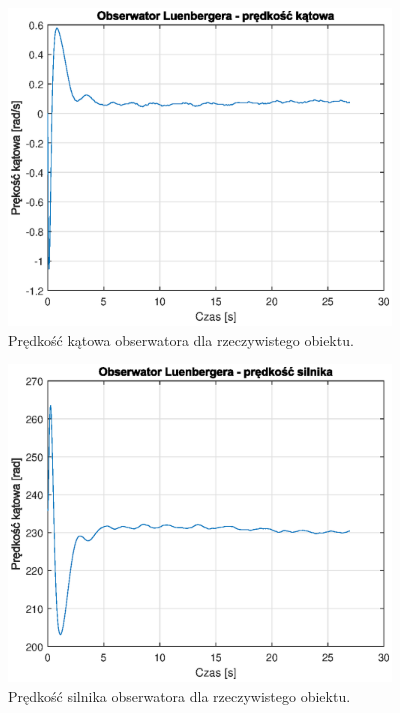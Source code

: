 \documentclass[11pt,a4paper]{article}
\begin{document}
\begin{figure}[H]
	\centering
	\includegraphics[width=4in]{Figures/obsv_obj_dalpha_v.eps}
	\caption{Prędkość kątowa obserwatora dla rzeczywistego obiektu.}
	\label{fig:obsv_obj_dalpha_v}
\end{figure}

\begin{figure}[H]
	\centering
	\includegraphics[width=4in]{Figures/obsv_obj_w_v.eps}
	\caption{Prędkość silnika obserwatora dla rzeczywistego obiektu.}
	\label{fig:obsv_obj_w_v}
\end{figure}
\end{document}
